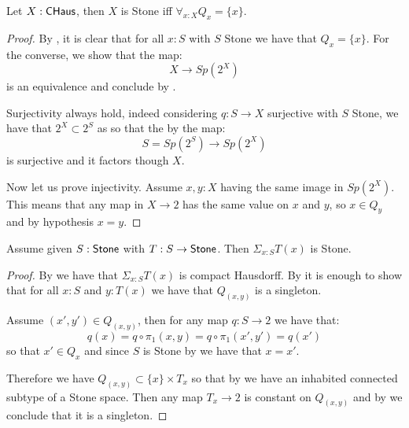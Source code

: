 \begin{lemma}\label{StoneCompactHausdorffTotallyDisconnected}
Let $X:\mathsf{CHaus}$, then $X$ is Stone iff $\forall_{x:X}Q_x=\{x\}$.
\end{lemma}

\begin{proof}
  By , it is clear that for all $x:S$ with $S$ Stone we have that $Q_x=\{x\}$.
%
For the converse, we show that the map:
\[X\to Sp(2^X)\]
is an equivalence and conclude by . 

Surjectivity always hold, indeed considering $q:S\to X$ surjective with $S$ Stone, we have that $2^X\subset 2^S$ as so that the by  the map:
$$S = Sp(2^S)\to Sp(2^X)$$
is surjective and it factors though $X$.

Now let us prove injectivity. Assume $x,y:X$ having the same image in $Sp(2^X)$. This means that any map in $X\to 2$ has the same value on $x$ and $y$, so $x\in Q_y$ and by hypothesis $x=y$.
\end{proof}

\begin{theorem}
  \label{stone-sigma-closed}
Assume given $S:\mathsf{Stone}$ with $T:S\to\mathsf{Stone}$. Then $\Sigma_{x:S}T(x)$ is Stone.
\end{theorem}

\begin{proof}
By  we have that $\Sigma_{x:S}T(x)$ is compact Hausdorff. By  it is enough to show that for all $x:S$ and $y:T(x)$ we have that $Q_{(x,y)}$ is a singleton.

Assume $(x',y')\in Q_{(x,y)}$, then for any map $q:S\to 2$ we have that:
$$ q(x) = q\circ \pi_1(x,y) = q\circ \pi_1(x',y') = q(x')$$
so that $x'\in Q_x$ and since $S$ is Stone by  we have that $x=x'$.

Therefore we have $Q_{(x,y)}\subset \{x\}\times T_x$ so that by  we have an inhabited  connected subtype of a Stone space. Then any map $T_x\to 2$ is constant on $Q_{(x,y)}$ and by  we conclude that it is a singleton.
\end{proof}


